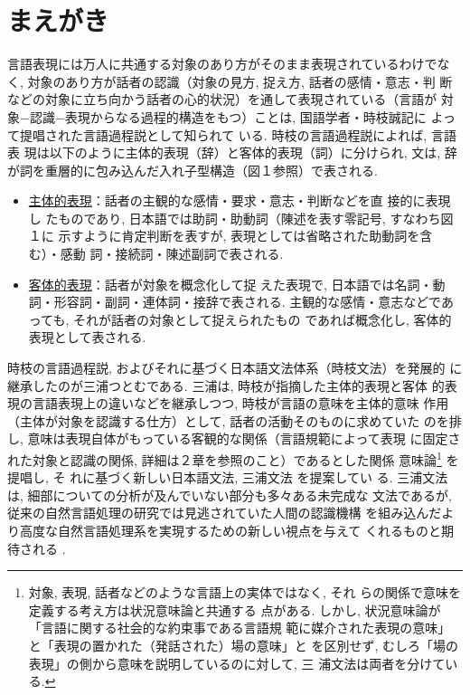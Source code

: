 

\maketitle

\section{まえがき}

言語表現には万人に共通する対象のあり方がそのまま表現されているわけでな
く, 対象のあり方が話者の認識（対象の見方, 捉え方, 話者の感情・意志・判
断などの対象に立ち向かう話者の心的状況）を通して表現されている（言語が
対象−認識−表現からなる過程的構造をもつ）ことは, 国語学者・時枝誠記に
よって提唱された言語過程説\cite{Tokieda1941,Tokieda1950}として知られて
いる. 時枝の言語過程説によれば, 言語表
現は以下のように主体的表現（辞）と客体的表現（詞）に分けられ, 文は, 辞
が詞を重層的に包み込んだ入れ子型構造（図１参照）で表される. 
\begin{itemize}
\item \underline{主体的表現}：話者の主観的な感情・要求・意志・判断などを直
接的に表現し
たものであり, 日本語では助詞・助動詞（陳述を表す零記号, すなわち図１に
示すように肯定判断を表すが, 表現としては省略された助動詞を含む）・感動
詞・接続詞・陳述副詞で表される. 
\item \underline{客体的表現}：話者が対象を概念化して捉
えた表現で, 日本語では名詞・動詞・形容詞・副詞・連体詞・接辞で表される. 
主観的な感情・意志などであっても, それが話者の対象として捉えられたもの
であれば概念化し, 客体的表現として表される.
\end{itemize}

時枝の言語過程説, およびそれに基づく日本語文法体系（時枝文法）を発展的
に継承したのが三浦つとむである. 三浦は, 時枝が指摘した主体的表現と客体
的表現の言語表現上の違いなどを継承しつつ, 時枝が言語の意味を主体的意味
作用（主体が対象を認識する仕方）として, 話者の活動そのものに求めていた
のを排し, 意味は表現自体がもっている客観的な関係（言語規範によって表現
に固定された対象と認識の関係, 詳細は２章を参照のこと）であるとした関係
意味論\footnote{対象, 表現, 話者などのような言語上の実体ではなく, それ
らの関係で意味を定義する考え方は状況意味論\cite{Barwise1983}と共通する
点がある. しかし, 状況意味論が「言語に関する社会的な約束事である言語規
範に媒介された表現の意味」と「表現の置かれた（発話された）場の意味」と
を区別せず, むしろ「場の表現」の側から意味を説明しているのに対して, 三
浦文法は両者を分けている. }  \cite{Miura1977,Ikehara1991}を提唱し, そ
れに基づく新しい日本語文法, 三浦文法
\cite{Miura1967a,Miura1967b,Miura1972,Miura1975,Miura1976}を提案してい
る. 三浦文法は, 細部についての分析が及んでいない部分も多々ある未完成な
文法であるが, 従来の自然言語処理の研究では見逃されていた人間の認識機構
を組み込んだより高度な自然言語処理系を実現するための新しい視点を与えて
くれるものと期待される
\cite{Ikehara1987,Ikehara1992,Miyazaki1992a,Miyazaki1992b}.

